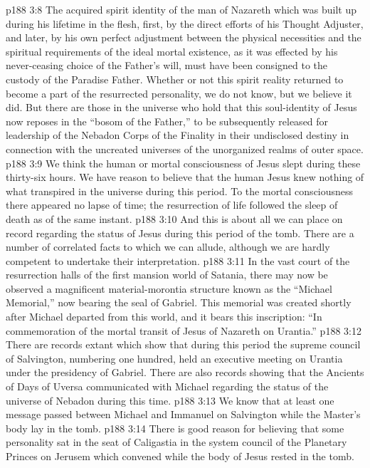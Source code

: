 \vs p188 3:8 \pc {}\bibnobreakspace The acquired spirit identity of the man of Nazareth which was built up during his lifetime in the flesh, first, by the direct efforts of his Thought Adjuster, and later, by his own perfect adjustment between the physical necessities and the spiritual requirements of the ideal mortal existence, as it was effected by his never\hyp{}ceasing choice of the Father’s will, must have been consigned to the custody of the Paradise Father. Whether or not this spirit reality returned to become a part of the resurrected personality, we do not know, but we believe it did. But there are those in the universe who hold that this soul\hyp{}identity of Jesus now reposes in the “bosom of the Father,” to be subsequently released for leadership of the Nebadon Corps of the Finality in their undisclosed destiny in connection with the uncreated universes of the unorganized realms of outer space.
\vs p188 3:9 \pc {}\bibnobreakspace We think the human or mortal consciousness of Jesus slept during these thirty\hyp{}six hours. We have reason to believe that the human Jesus knew nothing of what transpired in the universe during this period. To the mortal consciousness there appeared no lapse of time; the resurrection of life followed the sleep of death as of the same instant.
\vs p188 3:10 \pc And this is about all we can place on record regarding the status of Jesus during this period of the tomb. There are a number of correlated facts to which we can allude, although we are hardly competent to undertake their interpretation.
\vs p188 3:11 In the vast court of the resurrection halls of the first mansion world of Satania, there may now be observed a magnificent material\hyp{}morontia structure known as the “Michael Memorial,” now bearing the seal of Gabriel. This memorial was created shortly after Michael departed from this world, and it bears this inscription: “In commemoration of the mortal transit of Jesus of Nazareth on Urantia.”
\vs p188 3:12 There are records extant which show that during this period the supreme council of Salvington, numbering one hundred, held an executive meeting on Urantia under the presidency of Gabriel. There are also records showing that the Ancients of Days of Uversa communicated with Michael regarding the status of the universe of Nebadon during this time.
\vs p188 3:13 We know that at least one message passed between Michael and Immanuel on Salvington while the Master’s body lay in the tomb.
\vs p188 3:14 There is good reason for believing that some personality sat in the seat of Caligastia in the system council of the Planetary Princes on Jerusem which convened while the body of Jesus rested in the tomb.

